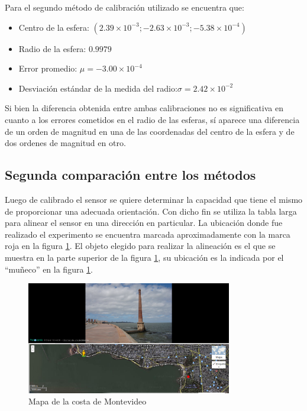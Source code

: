 \documentclass[main]{subfiles}
\begin{document}
Para el segundo método de calibración utilizado se encuentra que:
\begin{itemize}
\item Centro de la esfera: $(2.39\times10^{-3};-2.63\times10^{-3};-5.38\times10^{-4})$
\item Radio de la esfera: $0.9979$
\item Error promedio: $\mu =-3.00\times 10^{-4}$
\item Desviación estándar de la medida del radio:$\sigma = 2.42\times 10^{-2}$
\end{itemize}


Si bien la diferencia obtenida entre ambas calibraciones no es significativa en cuanto a los errores cometidos en el radio de las esferas, sí aparece una diferencia de un orden de magnitud en una de las coordenadas del centro de la esfera y de dos ordenes de magnitud en otro. 


\subsection{Segunda comparación entre los métodos}
Luego de calibrado el sensor se quiere determinar la capacidad que tiene el mismo de proporcionar una adecuada orientación. Con dicho fin se utiliza la tabla larga para alinear el sensor en una dirección en particular. La ubicación donde fue realizado el experimento se encuentra marcada aproximadamente con la marca roja en la figura \ref{fig:mapa}. El objeto elegido para realizar la alineación es el que se muestra en la parte superior de la figura \ref{fig:mapa}, su ubicación es la indicada por el ``muñeco'' en la figura \ref{fig:mapa}.
\begin{figure}
  \begin{center}
	\includegraphics[width=0.8\textwidth]
		{./pics_magneto/mapa.png}
	
  \end{center}
  \caption{Mapa de la costa de Montevideo}
  \label{fig:mapa}
\end{figure}
\end{document}
